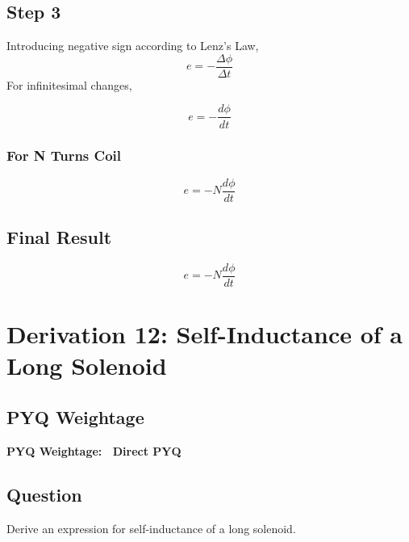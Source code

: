 \documentclass[11pt,a4paper]{article}
\begin{document}
\subsection*{Step 3}
Introducing negative sign according to Lenz's Law,
\[ e = -\frac{\Delta\phi}{\Delta t} \]
For infinitesimal changes,
\begin{tcolorbox}[colback=RoyalBlue!5!white, colframe=RoyalBlue]
    \[ e = -\frac{d\phi}{dt} \]
\end{tcolorbox}

\subsubsection*{For N Turns Coil}
\begin{tcolorbox}[colback=RoyalBlue!5!white, colframe=RoyalBlue]
    \[ e = -N\frac{d\phi}{dt} \]
\end{tcolorbox}

\subsection*{Final Result}
\begin{tcolorbox}[colback=RoyalBlue!5!white, colframe=RoyalBlue]
    \[ e = -N\frac{d\phi}{dt} \]
\end{tcolorbox}

\newpage

\section{Derivation 12: Self-Inductance of a Long Solenoid}

\subsection*{PYQ Weightage}
\begin{tcolorbox}[colback=yellow!10!white, colframe=orange, halign=center]
    \textbf{PYQ Weightage: \textasteriskcentered\textasteriskcentered\textasteriskcentered\textasteriskcentered\textasteriskcentered\ Direct PYQ}
\end{tcolorbox}

\subsection*{Question}
Derive an expression for self-inductance of a long solenoid.
\end{document}
